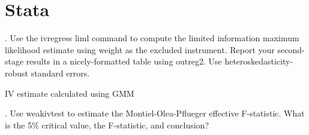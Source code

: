 \documentclass{article}
\begin{document}
\section{Stata}

. Use the ivregress liml command to compute the limited information maximum likelihood estimate using weight as the excluded instrument. Report your second-stage results in a nicely-formatted table using outreg2. Use heteroskedasticity-robust standard errors.

\begin{table}[h]
    \centering
    
    \caption{IV estimate calculated using GMM}
    \label{tab:stataIV}
\end{table}


. Use weakivtest to estimate the Montiel-Olea-Pflueger effective F-statistic. What is the 5\% critical value, the F-statistic, and conclusion?
\end{document}
